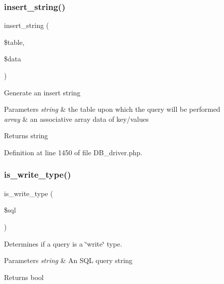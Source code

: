 \mbox{\label{class_c_i___d_b__driver_ad27720d886add2c9abf9ac48a9ff56d5}} 
\subsubsection{\texorpdfstring{insert\_string()}{insert\_string()}}
{\footnotesize\ttfamily insert\+\_\+string (\begin{DoxyParamCaption}\item[{}]{\$table,  }\item[{}]{\$data }\end{DoxyParamCaption})}

Generate an insert string


\begin{DoxyParams}{Parameters}
{\em string} & the table upon which the query will be performed \\
\hline
{\em array} & an associative array data of key/values \\
\hline
\end{DoxyParams}
\begin{DoxyReturn}{Returns}
string 
\end{DoxyReturn}


Definition at line 1450 of file D\+B\+\_\+driver.\+php.

\mbox{\label{class_c_i___d_b__driver_af435df5703c238769d6d16fde6d51182}} 
\subsubsection{\texorpdfstring{is\_write\_type()}{is\_write\_type()}}
{\footnotesize\ttfamily is\+\_\+write\+\_\+type (\begin{DoxyParamCaption}\item[{}]{\$sql }\end{DoxyParamCaption})}

Determines if a query is a \char`\"{}write\char`\"{} type.


\begin{DoxyParams}{Parameters}
{\em string} & An S\+QL query string \\
\hline
\end{DoxyParams}
\begin{DoxyReturn}{Returns}
bool 
\end{DoxyReturn}


